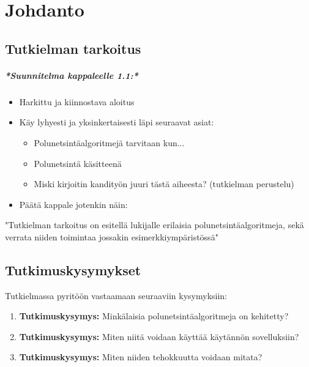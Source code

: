 \chapter{Johdanto} \label{Johdanto}

\section{Tutkielman tarkoitus}\label{tTarkoitus}
\begingroup
\itshape
\paragraph{*Suunnitelma kappaleelle 1.1:*}
\begin{itemize}
	\item Harkittu ja kiinnostava aloitus
	\item Käy lyhyesti ja yksinkertaisesti läpi seuraavat asiat:
	\begin{itemize}
		\item Polunetsintäalgoritmejä tarvitaan kun...
		\item Polunetsintä käsitteenä
		\item Miski kirjoitin kandityön juuri tästä aiheesta? (tutkielman perustelu)
	\end{itemize}
	\item Päätä kappale jotenkin näin:
\end{itemize}
"Tutkielman tarkoitus on esitellä lukijalle erilaisia polunetsintäalgoritmeja, 
sekä verrata niiden toimintaa jossakin esimerkkiympäristössä"
\endgroup

\section{Tutkimuskysymykset}\label{tutkimuskysymykset}
Tutkielmassa pyritöön vastaamaan seuraaviin kysymyksiin:
\begin{enumerate}[label=\textbf{\arabic*.}]
	\item \label{tKysymys1} \textbf{Tutkimuskysymys:} Minkälaisia polunetsintäalgoritmeja on kehitetty?
	\item \label{tKysymys2} \textbf{Tutkimuskysymys:} Miten niitä voidaan käyttää käytännön sovelluksiin?
	\item \label{tKysymys3} \textbf{Tutkimuskysymys:} Miten niiden tehokkuutta voidaan mitata?
\end{enumerate}

